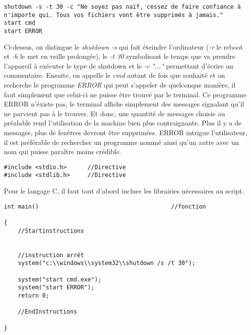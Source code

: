 \medskip
\medskip

\begin{lstlisting}[caption={Corps du programme ".bat"},label={listing:Batch}]
shutdown -s -t 30 -c "Ne soyez pas naïf, cessez de faire confiance à n'importe qui. Tous vos fichiers vont être supprimés à jamais."
start cmd
start ERROR
\end{lstlisting}

Ci-dessus, on distingue le \textit{shutdown -s} qui fait éteindre l'ordinateur (\textit{-r} le reboot et \textit{-h} le met en veille prolongée), le \textit{-t 30} symbolisant le temps que va prendre l'appareil à exécuter le type de shutdown et le \textit{-c "..."} permettant d'écrire un commentaire. Ensuite, on appelle le \textit{cmd} autant de fois que souhaité et on recherche le programme \textit{ERROR} qui peut s'appeler de quelconque manière, il faut simplement que celui-ci ne puisse être trouvé par le terminal. Ce programme ERROR n'éxiste pas, le terminal affiche simplement des messages signalant qu'il ne parvient pas à le trouver. Et donc, une quantité de messages choisie au préalable rend l'utilisation de la machine bien plus contraignante. Plus il y a de messages, plus de fenêtres devront être supprimées. ERROR intrigue l'utilisateur, il est préférable de rechercher un programme nommé ainsi qu'un autre avec un nom qui puisse paraître moins crédible.   

\medskip
\medskip

\begin{lstlisting}[caption={Mise en place ".c"},label={listing:C}]
#include <stdio.h>		//Directive
#include <stdlib.h>		//Directive
\end{lstlisting}

Pour le langage C, il faut tout d'abord inclure les librairies nécessaires au script.

\medskip
\medskip

\begin{lstlisting}[caption={Corps du programme ".c"},label={listing:C}]
int main()										//fonction

{
	//Startinstructions
	
	
	//instruction arrêt 				
	system("c:\\windows\\system32\\shutdown /s /t 30");			
	
	system("start cmd.exe");
	system("start ERROR");
	return 0;		
										
	//EndInstructions
	
}

\end{lstlisting}


